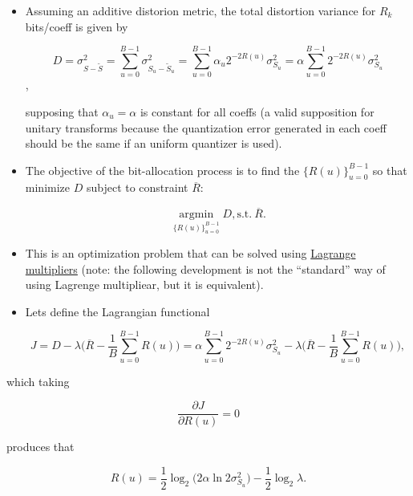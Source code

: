     \begin{itemize}
\item
  Assuming an additive distorion metric, the total distortion variance
  for \(R_k\) bits/coeff is given by

  \begin{equation}
    D = \sigma_{S-\tilde{S}}^2 = \sum_{u=0}^{B-1} \sigma_{S_u-\tilde{S}_u}^2 = \sum_{u=0}^{B-1}\alpha_u 2^{-2R(u)}\sigma_{S_u}^2 = \alpha\sum_{u=0}^{B-1}2^{-2R(u)}\sigma_{S_u}^2
    \tag{$D$}
  \end{equation},

  supposing that \(\alpha_u = \alpha\) is constant for all coeffs (a
  valid supposition for unitary transforms because the quantization
  error generated in each coeff should be the same if an uniform
  quantizer is used).
\item
  The objective of the bit-allocation process is to find the
  \(\{R(u)\}_{u=0}^{B-1}\) so that minimize \(D\) subject to constraint
  \(\overline{R}\):

  \begin{equation}
    \underset{\{R(u)\}_{u=0}^{B-1}}{\operatorname{arg min}} D, \text{s.t.}~{\overline{R}}. 
  \end{equation}
\item
  This is an optimization problem that can be solved using
  \href{https://en.wikipedia.org/wiki/Lagrange_multiplier}{Lagrange
  multipliers} (note: the following development is not the ``standard''
  way of using Lagrenge multipliear, but it is equivalent).
\item
  Lets define the Lagrangian functional

  \begin{equation}
    J = D - \lambda\Big( \overline{R} - \frac{1}{B}\sum_{u=0}^{B-1}R(u) \Big)= \alpha \sum_{u=0}^{B-1} 2^{-2R(u)}\sigma_{S_u}^2 - \lambda \Big( \overline{R} - \frac{1}{B}\sum_{u=0}^{B-1}R(u) \Big),
  \end{equation}
\end{itemize}

which taking

\begin{equation}
    \frac{\partial J}{\partial R(u)} = 0
  \end{equation}

produces that

\begin{equation}
    R(u) = \frac{1}{2}\log_2\big( 2\alpha\ln 2\sigma_{S_u}^2 \big) - \frac{1}{2}\log_2\lambda.
    \tag{$R(u)$}
  \end{equation}

